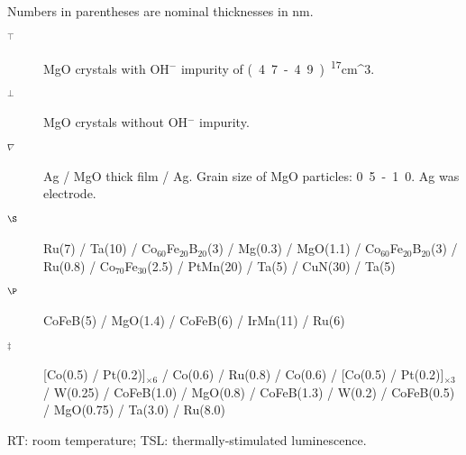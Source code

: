 \documentclass[molecules,review,submit,pdftex,moreauthors]{Definitions/mdpi}
\begin{document}
\begin{table*}
\footnotesize
\begin{flushleft}

Numbers in parentheses are nominal thicknesses in nm. 

\begin{description}
	\item[$^{\top}$] MgO crystals with OH$^{-}$ impurity of \unit{(4.7 - 4.9) ^{17}}{\per cm^{3}}.

	\item[$^{\bot}$] MgO crystals without OH$^{-}$ impurity.

	\item[$^{\nabla}$] Ag / MgO thick film / Ag.  Grain size of MgO particles: \unit{0.5 - 1.0}{\micro\meter}.  Ag was electrode. 

	\item[$^{\S}$] Ru(7) / Ta(10) / Co$_{60}$Fe$_{20}$B$_{20}$(3) / Mg(0.3) / MgO(1.1) / Co$_{60}$Fe$_{20}$B$_{20}$(3) / Ru(0.8) / Co$_{70}$Fe$_{30}$(2.5) / PtMn(20) / Ta(5) / CuN(30) / Ta(5)

	\item[$^{\P}$] CoFeB(5) / MgO(1.4) / CoFeB(6) / IrMn(11) / Ru(6)

	\item[$^{\ddagger}$] [Co(0.5) / Pt(0.2)]$_{\times 6}$ / Co(0.6) / Ru(0.8) / Co(0.6) / [Co(0.5) / Pt(0.2)]$_{\times 3}$ / W(0.25) / CoFeB(1.0) / MgO(0.8) / CoFeB(1.3) / W(0.2) / CoFeB(0.5) / MgO(0.75) / Ta(3.0) / Ru(8.0)

\end{description}

RT: room temperature;  TSL: thermally-stimulated luminescence.

\end{flushleft}

\end{table*}


\end{document}
